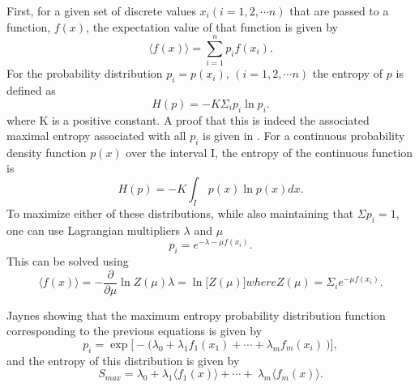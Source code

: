 First, for a given set of discrete values $x_i (i=1,2, \cdots n)$
that are passed to a function, $f(x)$, the expectation value of that function is given
by
\begin{equation}
  \big\langle f(x) \big\rangle = \sum_{i=1}^n p_if(x_i).
\end{equation}
For the probability distribution $p_i = p(x_i)$, $(i=1,2, \cdots n)$ the entropy of
$p$ is defined as
\begin{equation}
  H(p) = - K \Sigma_i p_i \ln p_i .
  \label{eq:entropy}
\end{equation}
where K is a positive constant. A proof that this is indeed the associated
maximal entropy associated with all $p_i$ is given in
\cite{jaynes_information_1957}.
For a continuous probability density function $p(x)$ over the interval I, the
entropy of the continuous function is
\begin{equation}
  H(p) = - K \int_I\ p(x) \ln p(x) dx .
\end{equation}
To maximize either of these distributions, while also maintaining that $\Sigma
p_i = 1$, one can use Lagrangian multipliers $\lambda$ and $\mu$
\begin{equation}
  p_i = e^{-\lambda-\mu f(x_i)} .
\end{equation}
This can be solved using
\begin{subequations}
  \begin{equation}
    \big\langle f(x) \big\rangle = - \frac{\partial}{\partial \mu} \ln Z(\mu)
  \end{equation}
  \begin{equation}
    \lambda = \ln\big[Z(\mu)\big]
  \end{equation}
  where
  \begin{equation}
    Z(\mu) = \Sigma_i e^{-\mu f(x_i)} .
  \end{equation}
\end{subequations}

Jaynes \cite{jaynes_information_1957} showing that the maximum
entropy probability distribution function corresponding to the previous
equations is given by
\begin{equation}
  p_i= \exp \big[ - \big( \lambda_0 + \lambda_1f_1(x_1) + \cdots + \lambda_m f_m(x_i) \
    \big) \big] ,
\end{equation}
and the entropy of this distribution is given by
\begin{equation}
  S_{max} = \lambda_0 + \lambda_1 \big\langle f_1 (x) \big\rangle + \cdots + \
  \lambda_m \big\langle f_m(x) \big\rangle .
\end{equation}

